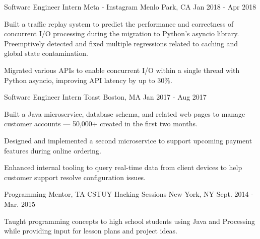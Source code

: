 \begin{cventries}
  \cventry
    {Software Engineer Intern} %
    {Meta - Instagram} %
    {Menlo Park, CA} %
    {Jan 2018 - Apr 2018} %
    {
      \begin{cvitems} %
        \item {Built a traffic replay system to predict the performance and correctness of concurrent I/O processing during the migration to Python's asyncio library. Preemptively detected and fixed multiple regressions related to caching and global state contamination.}
        \item {Migrated various APIs to enable concurrent I/O within a single thread with Python asyncio, improving API latency by up to 30\%.}
      \end{cvitems}
    }

  \cventry
    {Software Engineer Intern} %
    {Toast} %
    {Boston, MA} %
    {Jan 2017 - Aug 2017} %
    {
      \begin{cvitems} %
        \item {Built a Java microservice, database schema, and related web pages to manage customer accounts --- 50,000+ created in the first two months.}
        \item {Designed and implemented  a second microservice to support upcoming payment features during online ordering.}
        \item {Enhanced internal tooling to query real-time data from client devices to help customer support resolve configuration issues.}
      \end{cvitems}
    }

    \cventry
    {Programming Mentor, TA} %
    {CSTUY Hacking Sessions} %
    {New York, NY} %
    {Sept. 2014 - Mar. 2015} %
    {
      \begin{cvitems} %
        \item {Taught programming concepts to high school students using Java and Processing while providing input for lesson plans and project ideas.}
      \end{cvitems}
    }
\end{cventries}

